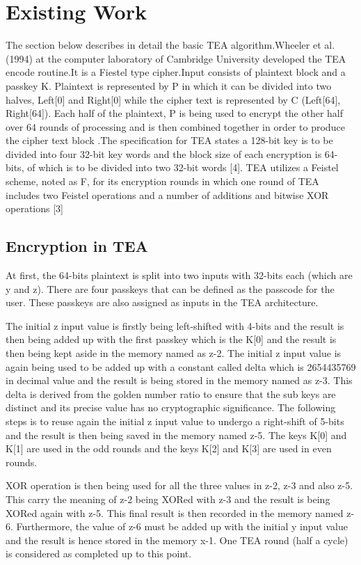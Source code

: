 \documentclass[letterpaper, 12 pt, conference]{ieeeconf}  %
\begin{document}
\section{Existing Work}
The section below describes in detail the basic TEA algorithm.Wheeler et al. (1994) at the computer laboratory of Cambridge University developed the TEA encode routine.It is a Fiestel type cipher.Input consists of plaintext block and a passkey K. Plaintext is represented by P in which it can be divided into two halves, Left[0] and Right[0] while the cipher text is represented by C (Left[64], Right[64]). Each half of the plaintext, P is being used to encrypt the other half over 64 rounds of processing and is then combined together in order to produce the cipher text block .The specification for TEA states a 128-bit key is to be divided into four 32-bit key words and the block size of each encryption is 64-bits, of which is to be divided into two 32-bit words [4]. TEA utilizes a Feistel scheme, noted as F, for its encryption rounds in which one round of TEA includes two Feistel operations and a number of additions and bitwise XOR operations [3]


\subsection{Encryption in TEA}
At first, the 64-bits plaintext is split into two inputs with 32-bits each (which are y and z). There are four passkeys that can be defined as the passcode for the user. These passkeys are also assigned as inputs in the TEA architecture. 

The initial z input value is firstly being left-shifted with 4-bits and the result is then being added up with the first passkey which is the K[0] and the result is then being kept aside in the memory named as z-2. The initial z input value is again being used to be added up with a constant called delta which is 2654435769 in decimal value and the result is being stored in the memory named as z-3. This delta  is derived from the golden number ratio to ensure that the sub keys are distinct and its precise value has no cryptographic significance.   The following steps is to reuse again the initial z input value to undergo a right-shift of 5-bits and the result is then being saved in the memory named z-5. The keys K[0] and K[1] are used in the odd rounds and the keys K[2] and K[3] are used in even rounds. 

 XOR operation is then being used for all the three values in z-2, z-3 and also z-5. This carry the meaning of z-2 being XORed with z-3 and the result is being XORed again with z-5. This final result is then recorded in the memory named z-6. Furthermore, the value of z-6 must be added up with the initial y input value and the result is hence stored in the memory x-1. One TEA round (half a cycle) is considered as completed up to this point. 
\end{document}
